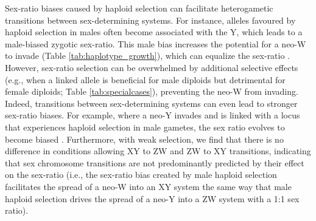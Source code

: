 \documentclass[12pt]{article}
\begin{document}
Sex-ratio biases caused by haploid selection can facilitate heterogametic transitions between sex-determining systems. 
For instance, alleles favoured by haploid selection in males often become associated with the Y, which leads to a male-biased zygotic sex-ratio.
This male bias increases the potential for a neo-W to invade (Table \ref{tab:haplotype_growth}), which can equalize the sex-ratio \citep[e.g., see Figure \ref{fig:SexRatioBad}B, for related examples see][]{Kozielska:2010vm,Ubeda:2015fx}.
However, sex-ratio selection can be overwhelmed by additional selective effects (e.g., when a linked allele is beneficial for male diploids but detrimental for female diploids; Table \ref{tab:specialcases}), preventing the neo-W from invading. %
Indeed, transitions between sex-determining systems can even lead to stronger sex-ratio biases.
For example, where a neo-Y invades and is linked with a locus that experiences haploid selection in male gametes, the sex ratio evolves to become biased \citep[e.g., see Figure \ref{fig:SexRatioBad}A and step 1 in][]{Ubeda:2015fx}.
Furthermore, with weak selection, we find that there is no difference in conditions allowing XY to ZW and ZW to XY transitions, indicating that sex chromosome transitions are not predominantly predicted by their effect on the sex-ratio (i.e., the sex-ratio bias created by male haploid selection facilitates the spread of a neo-W into an XY system the same way that male haploid selection drives the spread of a neo-Y into a ZW system with a 1:1 sex ratio). 
\end{document}
